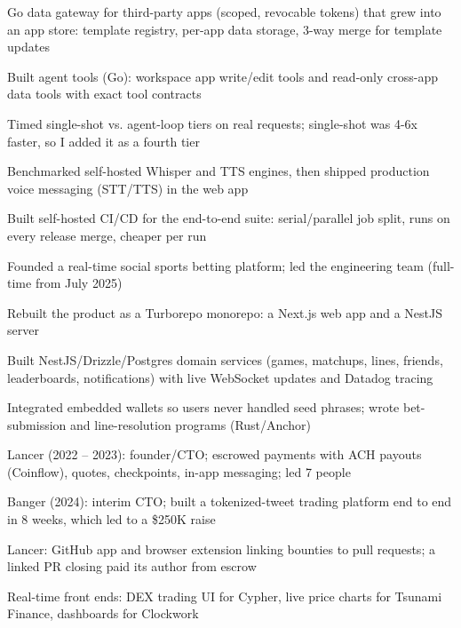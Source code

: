 \documentclass[print]{jack-resume}
\begin{document}
\begin{tightemize}
    \item Go data gateway for third-party apps (scoped, revocable tokens) that grew into an app store: template registry, per-app data storage, 3-way merge for template updates
    \item Built agent tools (Go): workspace app write/edit tools and read-only cross-app data tools with exact tool contracts
    \item Timed single-shot vs. agent-loop tiers on real requests; single-shot was 4-6x faster, so I added it as a fourth tier
    \item Benchmarked self-hosted Whisper and TTS engines, then shipped production voice messaging (STT/TTS) in the web app
    \item Built self-hosted CI/CD for the end-to-end suite: serial/parallel job split, runs on every release merge, cheaper per run
\end{tightemize}
\sectionsep

\begin{tightemize}
    \item Founded a real-time social sports betting platform; led the engineering team (full-time from July 2025)
    \item Rebuilt the product as a Turborepo monorepo: a Next.js web app and a NestJS server
    \item Built NestJS/Drizzle/Postgres domain services (games, matchups, lines, friends, leaderboards, notifications) with live WebSocket updates and Datadog tracing
    \item Integrated embedded wallets so users never handled seed phrases; wrote bet-submission and line-resolution programs (Rust/Anchor)
\end{tightemize}
\sectionsep

\begin{tightemize}
    \item Lancer (2022 -- 2023): founder/CTO; escrowed payments with ACH payouts (Coinflow), quotes, checkpoints, in-app messaging; led 7 people
    \item Banger (2024): interim CTO; built a tokenized-tweet trading platform end to end in 8 weeks, which led to a \$250K raise
    \item Lancer: GitHub app and browser extension linking bounties to pull requests; a linked PR closing paid its author from escrow
    \item Real-time front ends: DEX trading UI for Cypher, live price charts for Tsunami Finance, dashboards for Clockwork
\end{tightemize}
\sectionsep
\end{document}
